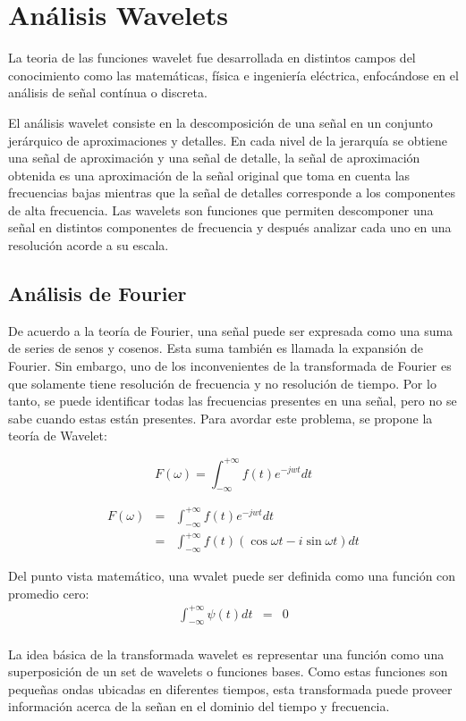 \section{Análisis Wavelets}
La teoria de las funciones wavelet fue desarrollada en distintos campos del
conocimiento como las matemáticas, física e ingeniería eléctrica, enfocándose
en el análisis de señal contínua o discreta.

El análisis wavelet consiste en la descomposición de una señal en un conjunto
jerárquico de aproximaciones y detalles. En cada nivel de la jerarquía se
obtiene una señal de aproximación y una señal de detalle, la señal de
aproximación obtenida es una aproximación de la señal original que toma en
cuenta las frecuencias bajas mientras que la señal de detalles corresponde a
los componentes de alta frecuencia. Las wavelets son funciones que permiten
descomponer una señal en distintos componentes de frecuencia y después analizar
cada uno en una resolución acorde a su escala.

\subsection{Análisis de Fourier}
De acuerdo a la teoría de Fourier, una señal puede ser expresada como una suma
de series de senos y cosenos. Esta suma también es llamada la expansión de
Fourier. Sin embargo, uno de los inconvenientes de la transformada de Fourier
es que solamente tiene resolución de frecuencia y no resolución de tiempo. Por
lo tanto, se puede identificar todas las frecuencias presentes en una señal,
pero no se sabe cuando estas están presentes. Para avordar este problema, se propone la teoría de Wavelet:

$$
F(\omega) = \int^{+\infty}_{-\infty} f(t)e^{-jwt} dt
$$

\begin{eqnarray*}
	F(\omega)	&=&	\int^{+\infty}_{-\infty} f(t)e^{-jwt}dt \\
				&=&	\int^{+\infty}_{-\infty} f(t)(\cos\omega t - i\sin\omega t)dt
\end{eqnarray*}

Del punto vista matemático, una wvalet puede ser definida como una función con promedio cero:
\begin{eqnarray*}
	\int^{+\infty}_{-\infty} \psi(t)dt &=& 0 \\
\end{eqnarray*}

La idea básica de la transformada wavelet es representar una función como una
superposición de un set de wavelets o funciones bases. Como estas funciones son
pequeñas ondas ubicadas en diferentes tiempos, esta transformada puede proveer
información acerca de la señan en el dominio del tiempo y frecuencia.

